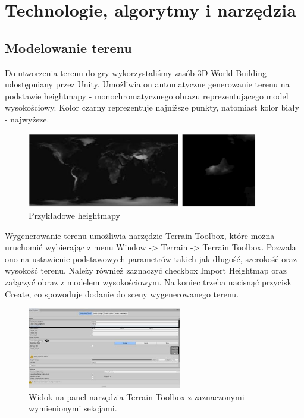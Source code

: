 \chapter{Technologie, algorytmy i narzędzia}\label{chap:algs}


\section{Modelowanie terenu}
Do utworzenia terenu do gry wykorzystaliśmy zasób 3D World Building udostępniany przez Unity. Umożliwia on automatyczne generowanie terenu na podstawie heightmapy - monochromatycznego obrazu reprezentującego model wysokościowy. Kolor czarny reprezentuje najniższe punkty, natomiast kolor biały -  najwyższe.

\begin{figure}[htbp]
    \centering
    \includegraphics[width=0.9\textwidth]{images/modelowanie_terenu/przykladowe_heightmapy.jpg}
    \caption{Przykładowe heightmapy}\label{fig:przykladowe_heightmapy}
\end{figure}

Wygenerowanie terenu umożliwia narzędzie Terrain Toolbox, które można uruchomić wybierając z menu Window -> Terrain -> Terrain Toolbox. Pozwala ono na ustawienie podstawowych parametrów takich jak długość, szerokość oraz wysokość terenu. Należy również zaznaczyć checkbox Import Heightmap oraz załączyć obraz z modelem wysokościowym. Na koniec trzeba nacisnąć przycisk Create, co spowoduje dodanie do sceny wygenerowanego terenu.

\begin{figure}[htbp]
    \centering
    \includegraphics[width=0.6\textwidth]{images/modelowanie_terenu/generowanie.jpg}
    \caption{Widok na panel narzędzia Terrain Toolbox z zaznaczonymi wymienionymi sekcjami.}\label{fig:generowanie_terenu}
\end{figure}


